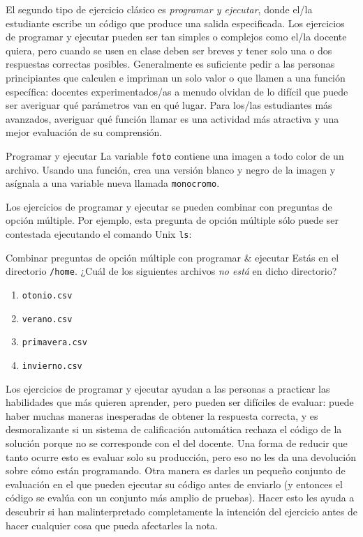 El segundo tipo de ejercicio clásico es \emph{programar y ejecutar},
donde el/la estudiante escribe un código que produce una salida especificada. 
Los ejercicios de programar y ejecutar pueden ser tan simples o complejos como el/la docente quiera, pero cuando se usen en clase deben ser breves y tener solo una o dos respuestas correctas posibles.
Generalmente es suficiente pedir a las personas principiantes que calculen e impriman un solo valor o que llamen a una función específica:
docentes experimentados/as a menudo olvidan de lo difícil que puede ser averiguar qué parámetros van en qué lugar.
Para los/las estudiantes  más avanzados, averiguar qué función llamar es una actividad más atractiva y una mejor evaluación de su comprensión.

\begin{aside}{Programar y ejecutar}
La variable \texttt{foto} contiene una imagen a todo color de un archivo.
Usando una función,
crea una versión blanco y negro de la imagen
y asígnala a una variable nueva llamada \texttt{monocromo}.
\end{aside}

Los ejercicios de programar y ejecutar se pueden combinar con preguntas de opción múltiple.
Por ejemplo,
esta pregunta de opción múltiple sólo puede ser contestada ejecutando el comando Unix \texttt{ls}:

\begin{aside}{Combinar preguntas de opción múltiple con programar \& ejecutar}
  Estás en el directorio  \texttt{/home}.
  ¿Cuál de los siguientes archivos \emph{no está} en dicho directorio?
  \begin{enumerate}
  \item
    \texttt{otonio.csv}
  \item
    \texttt{verano.csv}
  \item
    \texttt{primavera.csv}
  \item
    \texttt{invierno.csv}
  \end{enumerate}
\end{aside}

Los ejercicios de programar y ejecutar ayudan a las personas a practicar las habilidades que más quieren aprender,
pero pueden ser  difíciles de evaluar:
puede haber muchas maneras inesperadas de obtener la respuesta correcta,
y es desmoralizante si un sistema de calificación automática rechaza el código de la solución porque no se corresponde con el del docente.
Una forma de reducir que tanto ocurre esto es evaluar solo su producción,
pero eso no les da una devolución sobre cómo están programando.
Otra manera es darles un pequeño conjunto de evaluación en el que pueden ejecutar su código antes de enviarlo
(y entonces el código se evalúa con un conjunto más amplio de pruebas).
Hacer esto les ayuda a descubrir si han malinterpretado completamente la intención del ejercicio antes de hacer cualquier cosa que pueda afectarles la nota.

